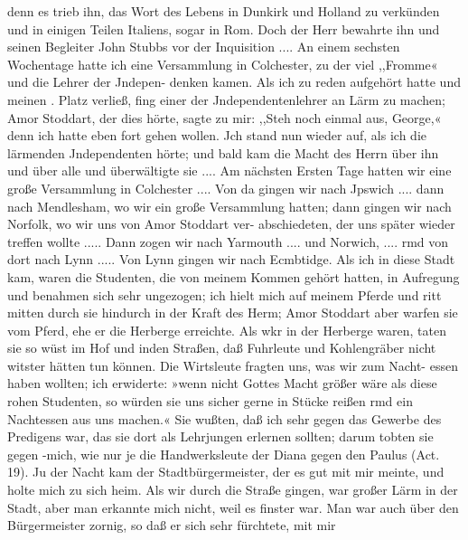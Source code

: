 {%
denn es trieb ihn, das Wort des Lebens in Dunkirk und Holland
zu verkünden und in einigen Teilen Italiens, sogar in Rom.
Doch der Herr bewahrte ihn und seinen Begleiter John Stubbs
vor der Inquisition ....
An einem sechsten Wochentage hatte ich eine Versammlung
in Colchester, zu der viel ,,Fromme« und die Lehrer der Jndepen-
denken kamen. Als ich zu reden aufgehört hatte und meinen
. Platz verließ, fing einer der Jndependentenlehrer an Lärm zu
machen; Amor Stoddart, der dies hörte, sagte zu mir: ,,Steh
noch einmal aus, George,« denn ich hatte eben fort gehen wollen.
Jch stand nun wieder auf, als ich die lärmenden Jndependenten
hörte; und bald kam die Macht des Herrn über ihn und über
alle und überwältigte sie ....
Am nächsten Ersten Tage hatten wir eine große Versammlung
in Colchester .... Von da gingen wir nach Jpswich .... dann
nach Mendlesham, wo wir ein große Versammlung hatten; dann
gingen wir nach Norfolk, wo wir uns von Amor Stoddart ver-
abschiedeten, der uns später wieder treffen wollte ..... Dann
zogen wir nach Yarmouth .... und Norwich, .... rmd von
dort nach Lynn ..... Von Lynn gingen wir nach Ecmbtidge.
Als ich in diese Stadt kam, waren die Studenten, die von
meinem Kommen gehört hatten, in Aufregung und benahmen
sich sehr ungezogen; ich hielt mich auf meinem Pferde und ritt
mitten durch sie hindurch in der Kraft des Herm; Amor Stoddart
aber warfen sie vom Pferd, ehe er die Herberge erreichte. Als
wkr in der Herberge waren, taten sie so wüst im Hof und inden
Straßen, daß Fuhrleute und Kohlengräber nicht witster hätten
tun können. Die Wirtsleute fragten uns, was wir zum Nacht-
essen haben wollten; ich erwiderte: »wenn nicht Gottes Macht
größer wäre als diese rohen Studenten, so würden sie uns sicher
gerne in Stücke reißen rmd ein Nachtessen aus uns machen.« Sie
wußten, daß ich sehr gegen das Gewerbe des Predigens war, das
sie dort als Lehrjungen erlernen sollten; darum tobten sie gegen
-mich, wie nur je die Handwerksleute der Diana gegen den Paulus
(Act. 19). Ju der Nacht kam der Stadtbürgermeister, der es gut
mit mir meinte, und holte mich zu sich heim. Als wir durch
die Straße gingen, war großer Lärm in der Stadt, aber man
erkannte mich nicht, weil es finster war. Man war auch über
den Bürgermeister zornig, so daß er sich sehr fürchtete, mit mir


}
